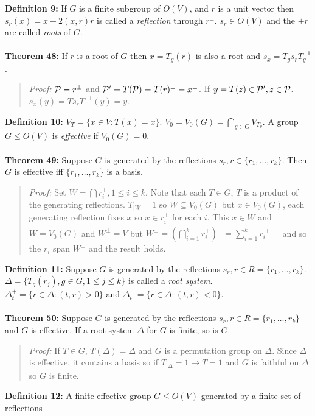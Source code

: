 {\bf Definition 9:}  If $G$ is a finite subgroup of $O(V)$, and
$r$ is a unit vector then $s_{r}(x)= x- 2(x,r)r$ is called a \emph{reflection}
through $r^{\perp}$.  $s_r \in O(V)$ and the $\pm r$ are called \emph{roots}
of $G$.
\\
\\
{\bf Theorem 48:}
If $r$ is a root of $G$ then $x=T_g(r)$ is also a root and $s_x= T_g s_r T_g^{-1}$.
\begin{quote}
\emph{Proof:}  
${\cal P}= r^{\perp}$ and
${\cal P}'= T( {\cal P}) = T(r)^{\perp}= x^{\perp}$.  If $y= T(z) \in {\cal P}', z \in {\cal P}$.
$s_x(y) = Ts_rT^{-1}(y)= y$.
\end{quote}
{\bf Definition 10:}  $V_T= \{ x \in V: T(x)=x \}$.  $V_0 = V_0(G)= \bigcap_{g \in G} V_{T_g}$.
A group $G \le O(V)$ is \emph{effective} if $V_0(G)=0$.
\\
\\
{\bf Theorem 49:}
Suppose $G$ is generated by the reflections $s_r, r \in \{r_1, \ldots, r_k \}$.
Then $G$ is effective iff $\{r_1, \ldots, r_k \}$ is a basis.
\begin{quote}
\emph{Proof:}  
Set $W= \bigcap r_i^{\perp}, 1 \le i \le k$.  Note that each $T \in G$, $T$ is a product of
the generating reflections.  $T_{|W} = 1$ so $W \subseteq V_0(G)$ but 
$x \in V_0(G)$, each generating reflection fixes $x$ so $x \in r_i^{\perp}$ for each $i$.
This $ x \in W$ and $W= V_0(G)$ and $W^{\perp}= V$ but
$W^{\perp}= (\bigcap_{i=1}^k r_i^{\perp})^{\perp} = \sum_{i=1}^k r_i^{ \perp \perp}$
and so the $r_i$ span $W^{\perp}$ and the result holds.
\end{quote}
{\bf Definition 11:} 
Suppose $G$ is generated by the reflections $s_r, r \in R= \{r_1, \ldots, r_k \}$.
$\Delta= \{ T_g(r_j), g \in G, 1 \le j \le k \}$ is called a \emph{root system}.
$\Delta_t^+= \{ r \in \Delta: (t,r) > 0 \}$ and
$\Delta_t^-= \{ r \in \Delta: (t,r) < 0 \}$.
\\
\\
{\bf Theorem 50:}
Suppose $G$ is generated by the reflections $s_r, r \in R= \{r_1, \ldots, r_k \}$
and $G$ is effective.  If a root system $\Delta$ for $G$ is finite, so is $G$.
\begin{quote}
\emph{Proof:} 
If $T \in G$, $T(\Delta)= \Delta$ and $G$ is a permutation group on $\Delta$.
Since $\Delta$ is effective, it contains a basis so if $T_{| \Delta} =1  \rightarrow
T= 1$ and $G$ is faithful on $\Delta$ so $G$ is finite.
\end{quote}
{\bf Definition 12:} 
A finite effective group $G \le O(V)$ generated by a finite set of reflections
